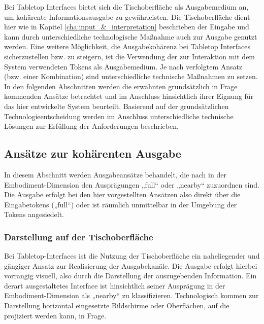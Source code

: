 Bei Tabletop Interfaces bietet sich die Tischoberfläche als Ausgabemedium an, um kohärente Informationsausgabe zu gewährleisten. Die Tischoberfläche dient hier wie in Kapitel \ref{cha:input_&_interpretation} beschrieben der Eingabe und kann durch unterschiedliche technologische Maßnahme auch zur Ausgabe genutzt werden. Eine weitere Möglichkeit, die Ausgabekohärenz bei Tabletop Interfaces sicherzustellen bzw. zu steigern, ist die Verwendung der zur Interaktion mit dem System verwendeten Tokens als Ausgabemedium. Je nach verfolgtem Ansatz (bzw. einer Kombination) sind unterschiedliche technische Maßnahmen zu setzen. In den folgenden Abschnitten werden die erwähnten grundsätzlich in Frage kommenden Ansätze betrachtet und im Anschluss hinsichtlich ihrer Eignung für das hier entwickelte System beurteilt. Basierend auf der grundsätzlichen Technologieentscheidung werden im Anschluss unterschiedliche technische Lösungen zur Erfüllung der Anforderungen beschrieben.

\subsection{Ansätze zur kohärenten Ausgabe} %
\label{sub:kohärente_ausgabe}

In diesem Abschnitt werden Ausgabeansätze behandelt, die nach \citep{Fishkin04} in der Embodiment-Dimension den Ausprägungen „full“ oder „nearby“ zuzuordnen sind. Die Ausgabe erfolgt bei den hier vorgestellten Ansätzen also direkt über die Eingabetokens („full“) oder ist räumlich unmittelbar in der Umgebung der Tokens angesiedelt.

\subsubsection{Darstellung auf der Tischoberfläche} %
\label{ssub:darstellung_auf_der_tischoberfläche}

Bei Tabletop-Interfaces ist die Nutzung der Tischoberfläche ein naheliegender und gängiger  Ansatz zur Realisierung der Ausgabekanäle. Die Ausgabe erfolgt hierbei vorrangig visuell, also durch die Darstellung der auszugebenden Information. Ein derart ausgestaltetes Interface ist hinsichtlich seiner Ausprägung in der Embodiment-Dimension als „nearby“ zu klassifizieren. Technologisch kommen zur Darstellung horizontal eingesetzte Bildschirme oder Oberflächen, auf die projiziert werden kann, in Frage.

